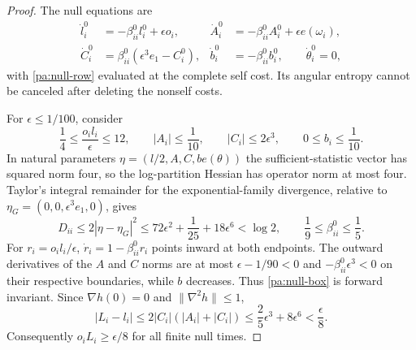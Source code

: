 \begin{proof}
The null equations are
\begin{equation}
 \begin{aligned}
 \dot l_i^0&=-\beta_{ii}^0l_i^0+\epsilon o_i,&
 \dot A_i^0&=-\beta_{ii}^0A_i^0+\epsilon e(\omega_i),\\
 \dot C_i^0&=\beta_{ii}^0(\epsilon^3e_1-C_i^0),&
 \dot b_i^0&=-\beta_{ii}^0b_i^0,\qquad\dot\theta_i^0=0,
 \end{aligned}
 \label{pa:angular-null}
\end{equation}
with \cref{pa:null-row} evaluated at the complete self cost. Its angular entropy cannot be canceled after deleting the nonself costs.

For $\epsilon\leq1/100$, consider
\begin{equation}
 \frac14\leq\frac{o_i l_i}{\epsilon}\leq12,\qquad
 |A_i|\leq\frac1{10},\qquad |C_i|\leq2\epsilon^3,\qquad
 0\leq b_i\leq\frac1{10}.
 \label{pa:null-box}
\end{equation}
In natural parameters $\eta=(l/2,A,C,b e(\theta))$ the sufficient-statistic vector has squared norm four, so the log-partition Hessian has operator norm at most four. Taylor's integral remainder for the exponential-family divergence, relative to $\eta_G=(0,0,\epsilon^3e_1,0)$, gives
\begin{equation}
 D_{ii}\leq2|\eta-\eta_G|^2
 \leq72\epsilon^2+\frac1{25}+18\epsilon^6<\log2,
 \qquad \frac19\leq\beta_{ii}^0\leq\frac15.
 \label{pa:null-bound}
\end{equation}
For $r_i=o_i l_i/\epsilon$, $\dot r_i=1-\beta_{ii}^0r_i$ points inward at both endpoints. The outward derivatives of the $A$ and $C$ norms are at most $\epsilon-1/90<0$ and $-\beta_{ii}^0\epsilon^3<0$ on their respective boundaries, while $b$ decreases. Thus \cref{pa:null-box} is forward invariant. Since $\nabla h(0)=0$ and $\|\nabla^2h\|\leq1$,
\begin{equation}
 |L_i-l_i|\leq2|C_i|(|A_i|+|C_i|)
 \leq\frac25\epsilon^3+8\epsilon^6<\frac\epsilon8.
 \label{pa:null-sign-bound}
\end{equation}
Consequently $o_iL_i\geq\epsilon/8$ for all finite null times.


\end{proof}
